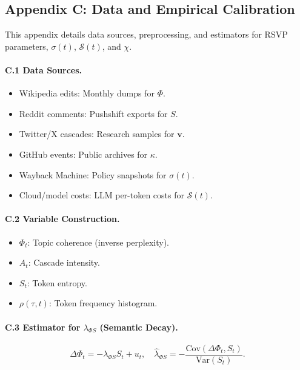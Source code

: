 \documentclass[12pt]{article}
\begin{document}
\subsection*{Appendix C: Data and Empirical Calibration}

This appendix details data sources, preprocessing, and estimators for RSVP parameters, \(\sigma(t)\), \(\mathcal{S}(t)\), and \(\chi\).

\paragraph{C.1 Data Sources.}

\begin{itemize}
  \item Wikipedia edits: Monthly dumps for \(\Phi\).
  \item Reddit comments: Pushshift exports for \(S\).
  \item Twitter/X cascades: Research samples for \(\mathbf{v}\).
  \item GitHub events: Public archives for \(\kappa\).
  \item Wayback Machine: Policy snapshots for \(\sigma(t)\).
  \item Cloud/model costs: LLM per-token costs for \(\mathcal{S}(t)\).
\end{itemize}

\paragraph{C.2 Variable Construction.}

\begin{itemize}
  \item \(\Phi_t\): Topic coherence (inverse perplexity).
  \item \(A_t\): Cascade intensity.
  \item \(S_t\): Token entropy.
  \item \(\rho(\tau, t)\): Token frequency histogram.
\end{itemize}

\paragraph{C.3 Estimator for \(\lambda_{\Phi S}\) (Semantic Decay).}

\[
\Delta \Phi_t = -\lambda_{\Phi S} S_t + u_t, \quad \widehat{\lambda}_{\Phi S} = -\frac{\text{Cov}(\Delta \Phi_t, S_t)}{\text{Var}(S_t)}.
\]
\end{document}
